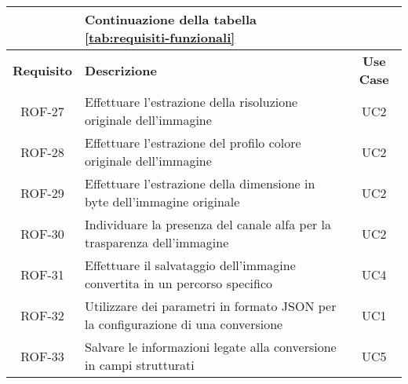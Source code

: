 \begin{table}
    \begin{tabularx}{\textwidth}{|c|X|c|}
        \hline

                                        & \centering \textbf{Continuazione della tabella
        \ref{tab:requisiti-funzionali}} &
        \\
        \hline
        \textbf{Requisito}              & \textbf{Descrizione}                                               & \textbf{Use Case} \\
        \hline
        ROF-27                          & Effettuare l'estrazione della risoluzione originale dell'immagine
                                        & UC2
        \\
        \hline
        ROF-28                          & Effettuare l'estrazione del profilo colore originale dell'immagine
                                        & UC2
        \\
        \hline
        ROF-29                          & Effettuare l'estrazione della dimensione in byte
        dell'immagine originale
                                        & UC2
        \\
        \hline
        ROF-30                          & Individuare la presenza del canale alfa per la
        trasparenza dell'immagine
                                        & UC2
        \\
        \hline
        ROF-31                          & Effettuare il salvataggio dell'immagine convertita
        in un percorso specifico
                                        & UC4
        \\
        \hline
        ROF-32                          & Utilizzare dei parametri in formato JSON per la
        configurazione di una conversione
                                        & UC1
        \\
        \hline
        ROF-33                          & Salvare le informazioni legate alla conversione in
        campi strutturati               & UC5
        \\
        \hline
    \end{tabularx}
\end{table}
